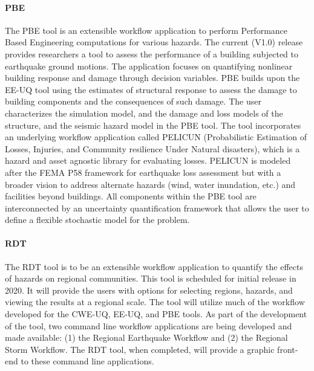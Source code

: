 \paragraph{PBE} The PBE tool is an extensible workflow application to perform Performance Based Engineering computations for various hazards. The current (V1.0) release provides researchers a tool to assess the performance of a building subjected to earthquake ground motions. The application focuses on quantifying nonlinear building response and damage through decision variables. PBE builds upon the EE-UQ tool using the estimates of structural response to assess the damage to building components and the consequences of such damage. The user characterizes the simulation model, and the damage and loss models of the structure, and the seismic hazard model in the PBE tool. The tool incorporates an underlying workflow application called PELICUN (Probabilistic Estimation of Losses, Injuries, and Community resilience Under Natural disasters), which is a hazard and asset agnostic library for evaluating losses. PELICUN is modeled after the FEMA P58 framework for earthquake loss assessment but with a broader vision to address alternate hazards (wind, water inundation, etc.) and facilities beyond buildings. All components within the PBE tool are interconnected by an uncertainty quantification framework that allows the user to define a flexible stochastic model for the problem.

\paragraph{RDT} The RDT tool is to be an extensible workflow application to quantify the effects of hazards on regional communities. This tool is scheduled for initial release in 2020. It will provide the users with options for selecting regions, hazards, and viewing the results at a regional scale. The tool will utilize much of the workflow developed for the CWE-UQ, EE-UQ, and PBE tools. As part of the development of the tool, two command line workflow applications are being developed and made available: (1) the Regional Earthquake Workflow and (2) the Regional Storm Workflow. The RDT tool, when completed, will provide a graphic front-end to these command line applications.

